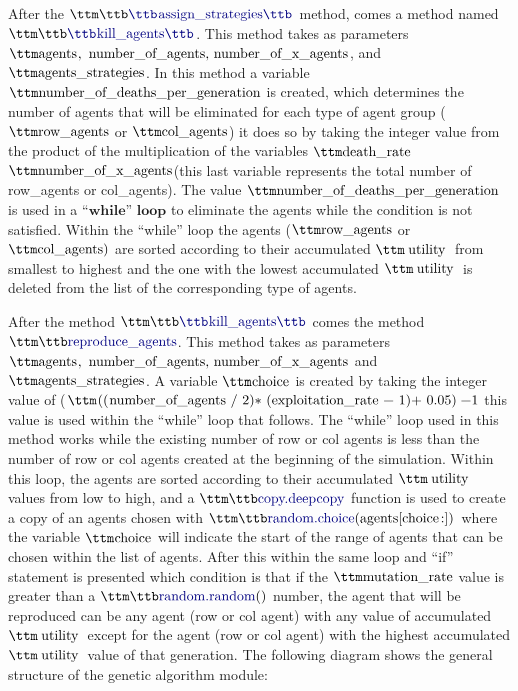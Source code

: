 After the $\pythoninline{assign\_strategies}$ method, comes a method named $\pythoninline{kill\_agents}$. This method takes as parameters $\pythoninline{agents, number\_of\_agents, number\_of\_x\_agents}$, and $\pythoninline{agents\_strategies}$. In this method a variable $\pythoninline{number\_of\_deaths\_per\_generation}$ is created, which determines the number of agents that will be eliminated for each type of agent group ($\pythoninline{row\_agents}$ or $\pythoninline{ col\_agents}$) it does so by taking the integer value from the product of the multiplication of the variables $\pythoninline{death\_rate}$ \* $\pythoninline{number\_of\_x\_agents}$(this last variable represents the total number of row\_agents or col\_agents).  The value $\pythoninline{number\_of\_deaths\_per\_generation}$ is used in a $\textbf{``while'' loop}$ to eliminate the agents while the condition is not satisfied. Within the ``while'' loop the agents ($\pythoninline{row\_agents}$ or $\pythoninline{col\_agents)}$  are sorted according to their accumulated $\pythoninline{utility}$ from smallest to highest and the one with the lowest accumulated $\pythoninline{utility}$ is deleted from the list of the corresponding type of agents.

After the method $\pythoninline{kill\_agents}$ comes the method $\pythoninline{reproduce\_agents}$. This method takes as parameters $\pythoninline{agents, number\_of\_agents, number\_of\_x\_agents}$ and $\pythoninline{agents\_strategies}$. A variable $\pythoninline{choice}$ is created by taking the integer value of ($\pythoninline{((number\_of\_agents / 2) \*  (exploitation\_rate - 1) + 0.05) -1}$ this value is used within the ``while'' loop that follows. The ``while'' loop used in this method works while the existing number of row or col agents is less than the number of row or col agents created at the beginning of the simulation. Within this loop, the agents are sorted according to their accumulated $\pythoninline{utility}$ values from low to high, and a $\pythoninline{copy.deepcopy}$  function is used to create a copy of an agents chosen with $\pythoninline{random.choice(agents[choice:])}$ where the variable $\pythoninline{choice}$ will indicate the start of the range of agents that can be chosen within the list of agents. After this within the same loop and ``if'' statement is presented which condition is that if the $\pythoninline{mutation\_rate}$ value is greater than a $\pythoninline{random.random()}$ number, the agent that will be reproduced can be any agent (row or col agent) with any value of accumulated $\pythoninline{utility}$ except for the agent (row or col agent) with the highest accumulated $\pythoninline{utility}$  value of that generation. The following diagram shows the general structure of the genetic algorithm module:

